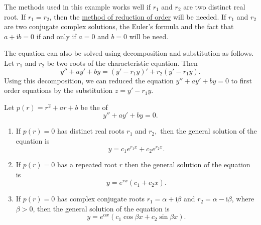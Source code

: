 The methods used in this example works well if $r_1$ and $r_2$ are two distinct real root. 
If $r_1=r_2$, then the \href{sec:ReductionOfOrder}{method of reduction of order} will be needed.
If $r_1$ and $r_2$ are two conjugate complex solutions, the Euler's formula and the fact that $a+\mathrm{i}b=0$ if and only if $a=0$ and $b=0$ will be need.

The equation can also be solved using decomposition and substitution as follows.
Let $r_1$ and $r_2$ be two roots of the characteristic equation. Then
\[y''+ay'+by=(y'-r_1y)'+r_2(y'-r_1y).\]
Using this decomposition, we can reduced the equation $y''+ay'+by=0$ to first order equations by the substitution $z=y'-r_1y$.

\begin{theorem}\label{thm:constcoef2ndorder}
  Let $p(r)=r^2+ar+b$ be the  of
\[y''+ay'+by=0.\]
\begin{enumerate}
  \item If $p(r)=0$ has distinct real roots $r_1$ and $r_2,$ then the general solution of the equation is 
  \[y=c_1e^{r_1x}+c_2e^{r_2x}.\]
  \item If $p(r)=0$ has a repeated root $r$ then the general solution of the equation is 
  \[y=e^{rx}(c_1+c_2x).\]
  \item If $p(r)=0$ has complex conjugate roots $r_1=\alpha+\mathrm{i}\beta$ and $r_2=\alpha-\mathrm{i}\beta$, where $\beta>0$, then the general solution of the equation is 
  \[y=e^{\alpha x}(c_1\cos\beta x+c_2\sin\beta x).\]
\end{enumerate}
\end{theorem}
